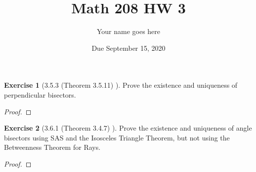 \documentclass[12pt]{article}		%
\title{Math 208 HW 3}
\author{Your name goes here}
\date{Due September 15, 2020}
\theoremstyle{definition}
\newtheorem*{ex}{Exercise}
\begin{document}
	\maketitle
	



\begin{ex}[3.5.3 (Theorem 3.5.11) ]
	Prove the existence and uniqueness of perpendicular bisectors.
\end{ex}

\begin{proof} 
	
\end{proof}

\vspace{1in} %



\begin{ex}[3.6.1 (Theorem 3.4.7)  ]
	Prove the existence and uniqueness of angle bisectors using SAS and the Isosceles Triangle Theorem, but not using the Betweenness Theorem for Rays.
\end{ex}

\begin{proof} 
	
\end{proof}

\vspace{1in} %
	
	
	
	
\end{document}
